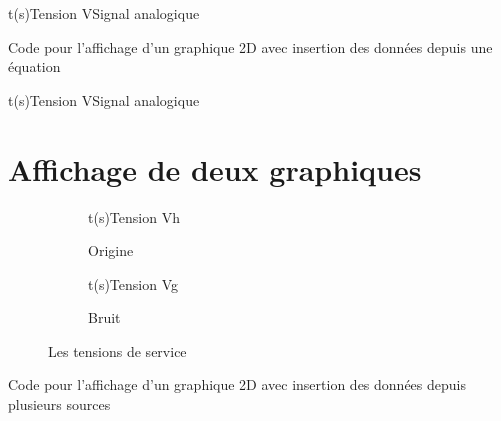 {
\begin{graphicFigure}{0.4}{0.4}{0}{3}{-1}{5}{t(s)}{Tension V}{Signal analogique}

  
\end{graphicFigure}
\setDefaultFillColor

\begin{Latex}{Code pour l'affichage d'un graphique 2D avec insertion des données depuis une équation}
  \begin{graphicFigure}{0.4}{0.4}{0}{3}{-1}{5}{t(s)}{Tension V}{Signal analogique}
  \end{graphicFigure}
\end{Latex}

\newpage
\section{Affichage de deux graphiques}

  \begin{figure}[h!]  
    \centering 
      \begin{subfigure}[b]{0.4\linewidth}
        \begin{graphic}{0.8}{1}{0}{1.2}{-1}{5}{t(s)}{Tension V}{h}
          \end{graphic}%
        \caption{Origine} 
      \end{subfigure}
    \begin{subfigure}[b]{0.4\linewidth}
      \begin{graphic}{0.8}{1}{0}{4}{-0.3}{0.3}{t(s)}{Tension V}{g}
        \end{graphic}%
    \caption{Bruit}
    \end{subfigure}
    \caption{Les tensions de service}
    \end{figure}  


  
    \begin{Latex}{Code pour l'affichage d'un graphique 2D avec insertion des données depuis plusieurs sources}


\end{Latex}}
